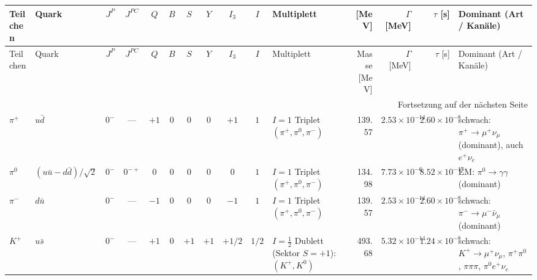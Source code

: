 \documentclass[10pt, letterpaper]{article}
\renewcommand{\arraystretch}{1.15}
\begin{document}
\pagebreak

\setlength{\tabcolsep}{3.5pt}
\renewcommand{\arraystretch}{1.12}

\begin{landscape}
\scriptsize

\begin{longtable}{@{}
p{1.05cm} %
p{1cm}  %
c         %
c         %
c c c c c c %
p{3.1cm}  %
r         %
r         %
r         %
p{5.3cm}  %
@{}}
\toprule
Teilchen & Quark & $J^P$ & $J^{PC}$ & $Q$ & $B$ & $S$ & $Y$ & $I_3$ & $I$ &
Multiplett &  [MeV] & $\Gamma$ [MeV] & $\tau$ [s] & Dominant (Art / Kanäle)
\\
\midrule
\endfirsthead

\toprule
Teilchen & Quark & $J^P$ & $J^{PC}$ & $Q$ & $B$ & $S$ & $Y$ & $I_3$ & $I$ &
Multiplett & Masse [MeV] & $\Gamma$ [MeV] & $\tau$ [s] & Dominant (Art / Kanäle)
\\
\midrule
\endhead

\midrule
\multicolumn{15}{r}{\footnotesize Fortsetzung auf der nächsten Seite}
\\
\endfoot

\bottomrule
\endlastfoot

$\pi^+$ & $u\bar d$ & $0^-$ & --- & $+1$ & $0$ & $0$ & $0$ & $+1$ & $1$
& $I=1$ Triplet $(\pi^+,\pi^0,\pi^-)$
& 139.57 & $2.53\times10^{-14}$ & $2.60\times10^{-8}$
& schwach: $\pi^+\to \mu^+\nu_\mu$ (dominant), auch $e^+\nu_e$
\\

$\pi^0$ & $(u\bar u-d\bar d)/\sqrt2$ & $0^-$ & $0^{-+}$ & $0$ & $0$ & $0$ & $0$ & $0$ & $1$
& $I=1$ Triplet $(\pi^+,\pi^0,\pi^-)$
& 134.98 & $7.73\times10^{-6}$ & $8.52\times10^{-17}$
& EM: $\pi^0\to \gamma\gamma$ (dominant)
\\

$\pi^-$ & $d\bar u$ & $0^-$ & --- & $-1$ & $0$ & $0$ & $0$ & $-1$ & $1$
& $I=1$ Triplet $(\pi^+,\pi^0,\pi^-)$
& 139.57 & $2.53\times10^{-14}$ & $2.60\times10^{-8}$
& schwach: $\pi^-\to \mu^-\bar\nu_\mu$ (dominant)
\\[2pt]

$K^+$ & $u\bar s$ & $0^-$ & --- & $+1$ & $0$ & $+1$ & $+1$ & $+1/2$ & $1/2$
& $I=\tfrac12$ Dublett (Sektor $S=+1$): $(K^+,K^0)$
& 493.68 & $5.32\times10^{-14}$ & $1.24\times10^{-8}$
& schwach: $K^+\to \mu^+\nu_\mu$, $\pi^+\pi^0$, $\pi\pi\pi$, $\pi^0 e^+\nu_e$
\\


\end{longtable}
\end{landscape}
\end{document}
